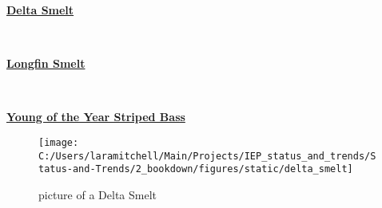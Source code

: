 \documentclass[
]{book}
\begin{document}
\begin{panel-grid}

\begin{columns-nocenter}

\begin{column800}

\textbf{\href{http://calfish.ucdavis.edu/species/?uid=47\&ds=698}{Delta Smelt}}

\end{column800}

\begin{column40}

~

\end{column40}

\begin{column800}

\textbf{\href{http://calfish.ucdavis.edu/species/?uid=87\&ds=698}{Longfin Smelt}}

\end{column800}

\begin{column40}

~

\end{column40}

\begin{column800}

\textbf{\href{http://calfish.ucdavis.edu/species/?uid=160\&ds=698}{Young of the Year Striped Bass}}

\end{column800}

\end{columns-nocenter}

\begin{columns-nocenter}

\begin{column800}

\begin{figure}

{\centering \texttt{[image: C:/Users/laramitchell/Main/Projects/IEP\_status\_and\_trends/Status-and-Trends/2\_bookdown/figures/static/delta\_smelt]} 

}

\caption{picture of a Delta Smelt}\label{fig:unnamed-chunk-121}
\end{figure}

\end{column800}

\begin{column40}


\end{column40}
\end{columns-nocenter}
\end{panel-grid}
\end{document}
